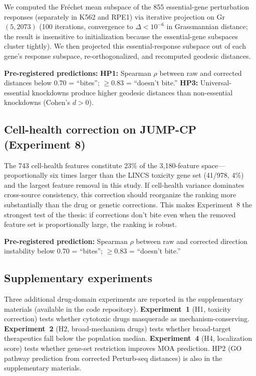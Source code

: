 \documentclass{article}
\begin{document}
We computed the Fr\'echet mean subspace of the 855 essential-gene
perturbation responses (separately in K562 and RPE1) via iterative
projection on Gr$(5, 2073)$ (100 iterations, convergence to
$\Delta < 10^{-6}$ in Grassmannian distance; the result is insensitive
to initialization because the essential-gene subspaces cluster tightly).
We then projected this essential-response subspace out of each gene's
response subspace, re-orthogonalized, and recomputed geodesic distances.

\textbf{Pre-registered predictions:}
\textbf{HP1:} Spearman $\rho$ between raw and corrected distances below
0.70 = ``bites''; $\geq 0.83$ = ``doesn't bite.''
\textbf{HP3:} Universal-essential knockdowns produce higher geodesic
distances than non-essential knockdowns (Cohen's $d > 0$).

\subsection{Cell-health correction on JUMP-CP (Experiment 8)}

The 743 cell-health features constitute 23\% of the 3{,}180-feature
space---proportionally six times larger than the LINCS toxicity gene set
(41/978, 4\%) and the largest feature removal in this study. If cell-health
variance dominates cross-source consistency, this correction should
reorganize the ranking more substantially than the drug or genetic
corrections. This makes Experiment~8 the strongest test of the thesis:
if corrections don't bite even when the removed feature set is
proportionally large, the ranking is robust.

\textbf{Pre-registered prediction:} Spearman $\rho$ between raw and
corrected direction instability below 0.70 = ``bites''; $\geq 0.83$ =
``doesn't bite.''

\subsection{Supplementary experiments}

Three additional drug-domain experiments are reported in the supplementary
materials (available in the code repository). \textbf{Experiment~1}
(H1, toxicity correction) tests whether cytotoxic drugs masquerade as
mechanism-conserving. \textbf{Experiment~2} (H2, broad-mechanism drugs)
tests whether broad-target therapeutics fall below the population median.
\textbf{Experiment~4} (H4, localization score) tests whether gene-set
restriction improves MOA prediction. HP2 (GO pathway prediction from
corrected Perturb-seq distances) is also in the supplementary materials.
\end{document}
